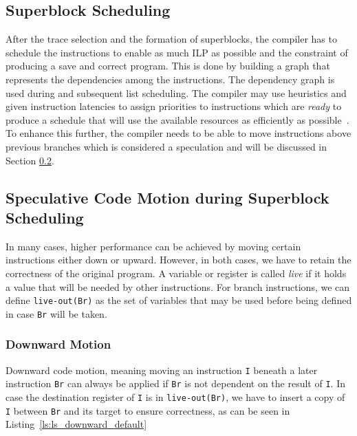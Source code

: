 \subsection{Superblock Scheduling}
After the trace selection and the formation of superblocks, the compiler has to schedule the instructions to enable as much ILP as possible and the constraint of producing a save and correct program. This is done by building a graph that represents the dependencies among the instructions. The dependency graph is used during and subsequent list scheduling. The compiler may use heuristics and given instruction latencies to assign priorities to instructions which are \textit{ready} to produce a schedule that will use the available resources as efficiently as possible~\cite{chang95}. To enhance this further, the compiler needs to be able to move instructions above previous branches which is considered a speculation and will be discussed in Section \ref{sec:spec_motion}. 

\subsection{Speculative Code Motion during Superblock Scheduling}
\label{sec:spec_motion}
In many cases, higher performance can be achieved by moving certain instructions either down or upward. However, in both cases, we have to retain the correctness of the original program. A variable or register is called \textit{live} if it holds a value that will be needed by other instructions.  For branch instructions, we can define \texttt{live-out(Br)} as the set of variables that may be used before being defined in case \texttt{Br} will be taken.

\subsubsection{Downward Motion}
Downward code motion, meaning moving an instruction \texttt{I} beneath a later instruction \texttt{Br} can always be applied if \texttt{Br} is not dependent on the result of \texttt{I}. In case the destination register of \texttt{I} is in \texttt{live-out(Br)}, we have to insert a copy of \texttt{I} between \texttt{Br} and its target to ensure correctness, as can be seen in Listing~\ref{ls:ls_downward_default}

